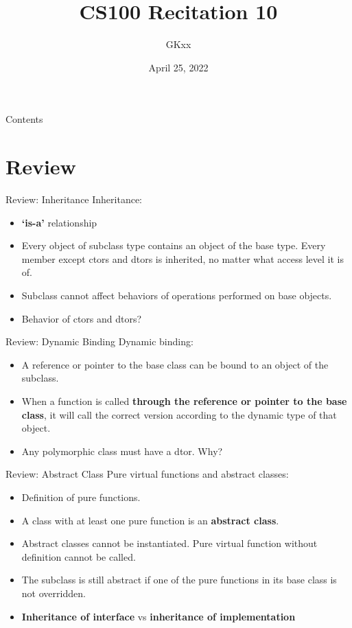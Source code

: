 \documentclass{beamer}
\title{CS100 Recitation 10}
\author{GKxx}
\date{April 25, 2022}
\begin{document}
\begin{frame}
    \maketitle
\end{frame}

\begin{frame}{Contents}
    \tableofcontents
\end{frame}

\section{Review}

\begin{frame}{Review: Inheritance}
    Inheritance:
    \begin{itemize}
        \item \textbf{`is-a'} relationship
        \item Every object of subclass type contains an object of the base type. Every member except ctors and dtors is inherited, no matter what access level it is of.
        \item Subclass cannot affect behaviors of operations performed on base objects.
        \pause
        \item Behavior of ctors and dtors?
    \end{itemize}
\end{frame}

\begin{frame}{Review: Dynamic Binding}
    Dynamic binding:
    \begin{itemize}
        \item A reference or pointer to the base class can be bound to an object of the subclass.
        \item When a \virtual function is called \textbf{through the reference or pointer to the base class}, it will call the correct version according to the dynamic type of that object.
        \item Any polymorphic class must have a \virtual dtor. Why?
    \end{itemize}
\end{frame}

\begin{frame}{Review: Abstract Class}
    Pure virtual functions and abstract classes:
    \begin{itemize}
        \item Definition of pure \virtual functions.
        \item A class with at least one pure \virtual function is an \textbf{abstract class}.
        \item Abstract classes cannot be instantiated. Pure virtual function without definition cannot be called.
        \item The subclass is still abstract if one of the pure \virtual functions in its base class is not overridden.
        \pause
        \item \textbf{Inheritance of interface} vs \textbf{inheritance of implementation}
    \end{itemize}
\end{frame}
\end{document}
